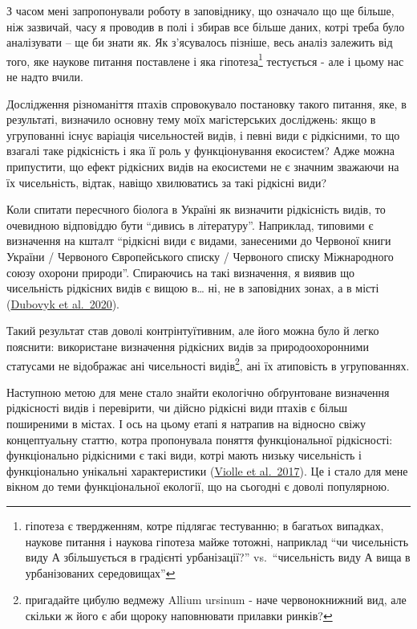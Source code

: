 \documentclass[
  11pt,
]{book}
\begin{document}
З часом мені запропонували роботу в заповіднику, що означало що ще
більше, ніж зазвичай, часу я проводив в полі і збирав все більше даних,
котрі треба було аналізувати -- ще би знати як. Як з'ясувалось пізніше,
весь аналіз залежить від того, яке наукове питання поставлене і яка
гіпотеза\footnote{гіпотеза є твердженням, котре підлягає тестуванню; в
  багатьох випадках, наукове питання і наукова гіпотеза майже тотожні,
  наприклад ``чи чисельність виду А збільшується в градієнті
  урбанізації?'' vs.~``чисельність виду А вища в урбанізованих
  середовищах''} тестується - але і цьому нас не надто вчили.

Дослідження різноманіття птахів спровокувало постановку такого питання,
яке, в результаті, визначило основну тему моїх магістерських досліджень:
якщо в угрупованні існує варіація чисельностей видів, і певні види є
рідкісними, то що взагалі таке рідкісність і яка її роль у
функціонування екосистем? Адже можна припустити, що ефект рідкісних
видів на екосистеми не є значним зважаючи на їх чисельність, відтак,
навіщо хвилюватись за такі рідкісні види?

Коли спитати пересчного біолога в Україні як визначити рідкісність
видів, то очевидною відповіддю бути ``дивись в літературу''. Наприклад,
типовими є визначення на кшталт ``рідкісні види є видами, занесеними до
Червоної книги України / Червоного Європейського списку / Червоного
списку Міжнародного союзу охорони природи''. Спираючись на такі
визначення, я виявив що чисельність рідкісних видів є вищою в\ldots{}
ні, не в заповідних зонах, а в місті
(\href{http://doi.org/10.15407/gb1904}{Dubovyk et al.~2020}).

Такий результат став доволі контрінтуїтивним, але його можна було й
легко пояснити: використане визначення рідкісних видів за
природоохоронними статусами не відображає ані чисельності
видів\footnote{пригадайте цибулю ведмежу Allium ursinum - наче
  червонокнижний вид, але скільки ж його є аби щороку наповнювати
  прилавки ринків?}, ані їх атиповість в угрупованнях.

Наступною метою для мене стало знайти екологічно обґрунтоване визначення
рідкісності видів і перевірити, чи дійсно рідкісні види птахів є більш
поширеними в містах. І ось на цьому етапі я натрапив на відносно свіжу
концептуальну статтю, котра пропонувала поняття функціональної
рідкісності: функціонально рідкісними є такі види, котрі мають низьку
чисельність і функціонально унікальні характеристики
(\href{https://doi.org/10.1016/j.tree.2017.02.002}{Violle et al.~2017}).
Це і стало для мене вікном до теми функціональної екології, що на
сьогодні є доволі популярною.
\end{document}
